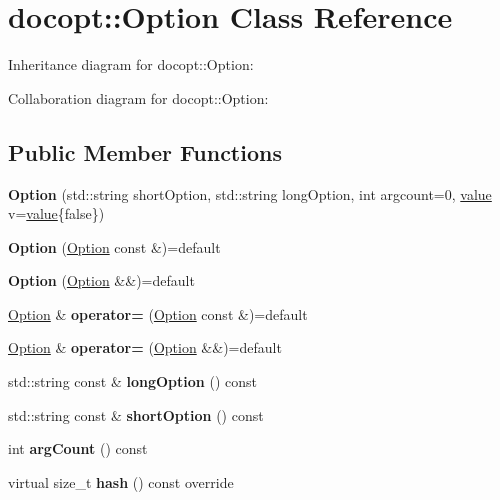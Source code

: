 \hypertarget{classdocopt_1_1Option}{}\section{docopt\+:\+:Option Class Reference}
\label{classdocopt_1_1Option}


Inheritance diagram for docopt\+:\+:Option\+:


Collaboration diagram for docopt\+:\+:Option\+:
\subsection*{Public Member Functions}
\begin{DoxyCompactItemize}
\item 
\mbox{\label{classdocopt_1_1Option_a1da09cf8c24b9e40450f5d22ec26502d}} 
{\bfseries Option} (std\+::string short\+Option, std\+::string long\+Option, int argcount=0, \hyperlink{structdocopt_1_1value}{value} v=\hyperlink{structdocopt_1_1value}{value}\{false\})
\item 
\mbox{\label{classdocopt_1_1Option_af3996b856bd191cf0712ed34fa916f07}} 
{\bfseries Option} (\hyperlink{classdocopt_1_1Option}{Option} const \&)=default
\item 
\mbox{\label{classdocopt_1_1Option_ac3860cc101da72b4309d6e58646c1441}} 
{\bfseries Option} (\hyperlink{classdocopt_1_1Option}{Option} \&\&)=default
\item 
\mbox{\label{classdocopt_1_1Option_a48eaf5c2cf58bcdca3246692ec50248f}} 
\hyperlink{classdocopt_1_1Option}{Option} \& {\bfseries operator=} (\hyperlink{classdocopt_1_1Option}{Option} const \&)=default
\item 
\mbox{\label{classdocopt_1_1Option_acdfcb2a8b52d42ad94d756208141beb7}} 
\hyperlink{classdocopt_1_1Option}{Option} \& {\bfseries operator=} (\hyperlink{classdocopt_1_1Option}{Option} \&\&)=default
\item 
\mbox{\label{classdocopt_1_1Option_ab7d5c918813d3c5414ff418bab3ed6e9}} 
std\+::string const  \& {\bfseries long\+Option} () const
\item 
\mbox{\label{classdocopt_1_1Option_a7c1a506e66873d965dbb97dfd165b295}} 
std\+::string const  \& {\bfseries short\+Option} () const
\item 
\mbox{\label{classdocopt_1_1Option_a76ef24dea8376a828eeb53daadc3c1dd}} 
int {\bfseries arg\+Count} () const
\item 
\mbox{\label{classdocopt_1_1Option_a98ea6657e77e1f78baaace69486bef6a}} 
virtual size\+\_\+t {\bfseries hash} () const override
\end{DoxyCompactItemize}
